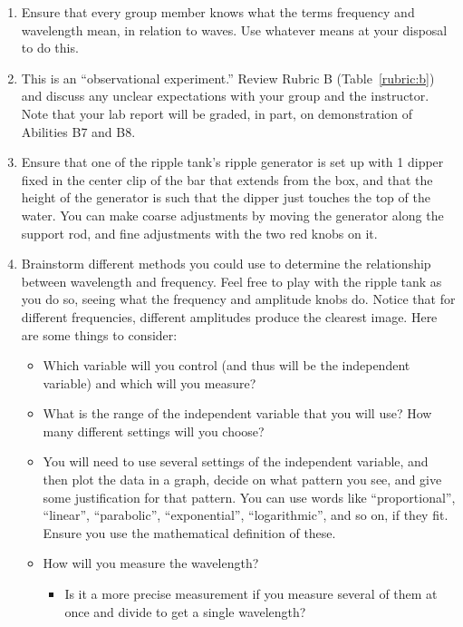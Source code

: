\begin{enumerate}

	\item Ensure that every group member knows what the terms frequency and wavelength mean, in relation to waves. Use whatever means at your disposal to do this.
	
	\item This is an ``observational experiment.'' Review Rubric B (Table~\ref{rubric:b}) and discuss any unclear expectations with your group and the instructor. Note that your lab report will be graded, in part, on demonstration of Abilities B7 and B8.
	
	\item Ensure that one of the ripple tank's ripple generator is set up with 1 dipper fixed in the center clip of the bar that extends from the box, and that the height of the generator is such that the dipper just touches the top of the water. You can make coarse adjustments by moving the generator along the support rod, and fine adjustments with the two red knobs on it.
	
	\item Brainstorm different methods you could use to determine the relationship between wavelength and frequency. Feel free to play with the ripple tank as you do so, seeing what the frequency and amplitude knobs do. Notice that for different frequencies, different amplitudes produce the clearest image. Here are some things to consider:
	\begin{itemize}
		\item Which variable will you control (and thus will be the independent variable) and which will you measure?
		
		\item What is the range of the independent variable that you will use? How many different settings will you choose?
		
		\item You will need to use several settings of the independent variable, and then plot the data in a graph, decide on what pattern you see, and give some justification for that pattern. You can use words like ``proportional'', ``linear'', ``parabolic'', ``exponential'', ``logarithmic'', and so on, if they fit. Ensure you use the mathematical definition of these.
		
		\item How will you measure the wavelength?
		\begin{itemize}
			\item Is it a more precise measurement if you measure several of them at once and divide to get a single wavelength?
			

\end{itemize}
\end{itemize}
\end{enumerate}
